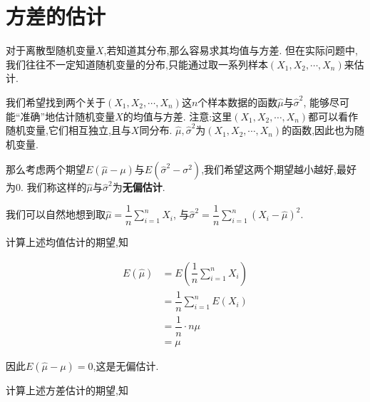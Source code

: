 \documentclass{article}
\begin{document}
\section{方差的估计}

对于离散型随机变量$X$,若知道其分布,那么容易求其均值与方差.
但在实际问题中,我们往往不一定知道随机变量的分布,只能通过取一系列样本$(X_1, X_2, \cdots, X_n)$来估计.

我们希望找到两个关于$(X_1, X_2, \cdots, X_n)$这$n$个样本数据的函数$\hat{\mu}$与$\hat{\sigma}^2$,
能够尽可能``准确''地估计随机变量$X$的均值与方差.
注意:这里$(X_1, X_2, \cdots, X_n)$都可以看作随机变量,它们相互独立,且与$X$同分布.
$\hat{\mu}, \hat{\sigma}^2$为$(X_1, X_2, \cdots, X_n)$的函数,因此也为随机变量.

那么考虑两个期望$E(\hat{\mu} - \mu)$与$E(\hat{\sigma}^2 - \sigma^2)$,我们希望这两个期望越小越好,最好为0.
我们称这样的$\hat{\mu}$与$\hat{\sigma}^2$为\textbf{无偏估计}.

我们可以自然地想到取$\hat{\mu} = \dfrac{1}{n} \sum\limits_{i = 1}^n X_i$,
与$\hat{\sigma}^2 = \dfrac{1}{n} \sum\limits_{i = 1}^n (X_i - \hat{\mu})^2$.

计算上述均值估计的期望,知

\begin{align*}
    E(\hat{\mu}) & = E \left( \dfrac{1}{n} \sum_{i = 1}^n X_i \right) \\
    & = \dfrac{1}{n} \sum_{i = 1}^n E(X_i) \\
    & = \dfrac{1}{n} \cdot n \mu \\
    & = \mu
\end{align*}

因此$E(\hat{\mu} - \mu) = 0$,这是无偏估计.

计算上述方差估计的期望,知
\end{document}
